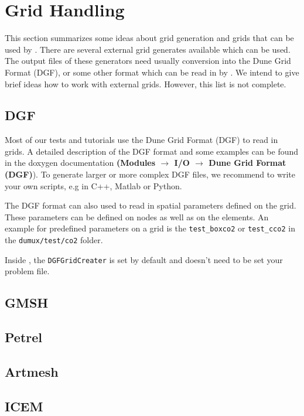 \section{Grid Handling}
\label{sec:gridhandling}

This section summarizes some ideas about grid generation and grids that can be used by \Dumux. There are several external grid generates available which can be used. The output files of these generators need usually conversion into the Dune Grid Format (DGF), or some other format which can be read in by \Dune. We intend to give brief ideas how to work with external grids. However, this list is not complete.

\subsection{DGF}
Most of our \Dumux tests and tutorials use the Dune Grid Format (DGF) to read in grids. A detailed description of the DGF format and some examples can be found in the \Dune doxygen documentation \textbf{(Modules $\rightarrow$ I/O $\rightarrow$ Dune Grid Format (DGF)}). To generate larger or more complex DGF files, we recommend to write your own scripts, e.g in C++, Matlab or Python.

The DGF format can also used to read in spatial parameters defined on the grid. These parameters can be defined on nodes as well as on the elements. An example for predefined parameters on a grid is the \texttt{test\_boxco2} or \texttt{test\_cco2} in the  \texttt{dumux/test/co2} folder.

Inside \Dumux, the \texttt{DGFGridCreater} is set by default and doesn't need to be set your problem file.


\subsection{GMSH}


\subsection{Petrel}


\subsection{Artmesh}


\subsection{ICEM}